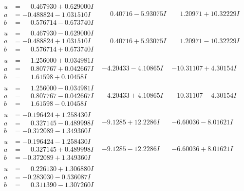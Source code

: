 \documentclass[1p]{elsarticle_modified}
\theoremstyle{definition}
\begin{document}
$$\begin{array}{c|c|c}
\begin{aligned}
u &= \phantom{-}0.467930 + 0.629000 I \\
a &= -0.488824 - 1.031510 I \\
b &= \phantom{-}0.576714 - 0.673740 I\end{aligned}
 & \phantom{-}0.40716 - 5.93075 I & \phantom{-}1.20971 + 10.32229 I \\ \hline\begin{aligned}
u &= \phantom{-}0.467930 - 0.629000 I \\
a &= -0.488824 + 1.031510 I \\
b &= \phantom{-}0.576714 + 0.673740 I\end{aligned}
 & \phantom{-}0.40716 + 5.93075 I & \phantom{-}1.20971 - 10.32229 I \\ \hline\begin{aligned}
u &= \phantom{-}1.256000 + 0.034981 I \\
a &= \phantom{-}0.807767 + 0.042667 I \\
b &= \phantom{-}1.61598 + 0.10458 I\end{aligned}
 & -4.20433 - 4.10865 I & -10.31107 + 4.30154 I \\ \hline\begin{aligned}
u &= \phantom{-}1.256000 - 0.034981 I \\
a &= \phantom{-}0.807767 - 0.042667 I \\
b &= \phantom{-}1.61598 - 0.10458 I\end{aligned}
 & -4.20433 + 4.10865 I & -10.31107 - 4.30154 I \\ \hline\begin{aligned}
u &= -0.196424 + 1.258430 I \\
a &= \phantom{-}0.327145 - 0.489998 I \\
b &= -0.372089 - 1.349360 I\end{aligned}
 & -9.1285 + 12.2286 I & -6.60036 - 8.01621 I \\ \hline\begin{aligned}
u &= -0.196424 - 1.258430 I \\
a &= \phantom{-}0.327145 + 0.489998 I \\
b &= -0.372089 + 1.349360 I\end{aligned}
 & -9.1285 - 12.2286 I & -6.60036 + 8.01621 I \\ \hline\begin{aligned}
u &= \phantom{-}0.226130 + 1.306880 I \\
a &= -0.283030 - 0.536087 I \\
b &= \phantom{-}0.311390 - 1.307260 I\end{aligned}

\end{array}$$
\end{document}
